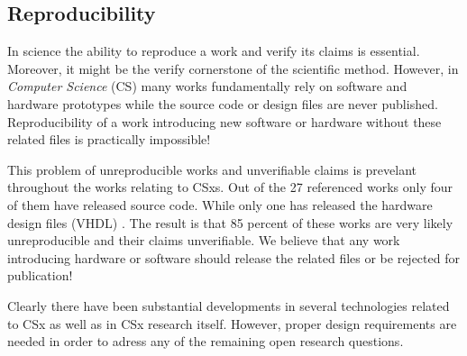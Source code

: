 


\subsection{Reproducibility}

In science the ability to reproduce a work and verify its claims is essential.
Moreover, it might be the verify cornerstone of the scientific method. However,
in \textit{Computer Science} (CS) many works fundamentally rely on software and
hardware prototypes while the source code or design files are never published.
Reproducibility of a work introducing new software or hardware without these
related files is practically impossible!

This problem of unreproducible works and unverifiable claims is prevelant
throughout the works relating to CSxs. Out of the 27 referenced works only four
\cite{10.14778/3137628.3137632, 234968, 8839401, lukken2021zcsd}
\footnotemark[8] of them have released source code. While only one has released
the hardware design files (VHDL) \cite{10.14778/3137628.3137632}. The result is
that 85 percent of these works are very likely unreproducible and their claims
unverifiable. We believe that any work introducing hardware or software should
release the related files or be rejected for publication!

Clearly there have been substantial developments in several technologies related
to CSx as well as in CSx research itself. However, proper design requirements
are needed in order to adress any of the remaining open research questions.


